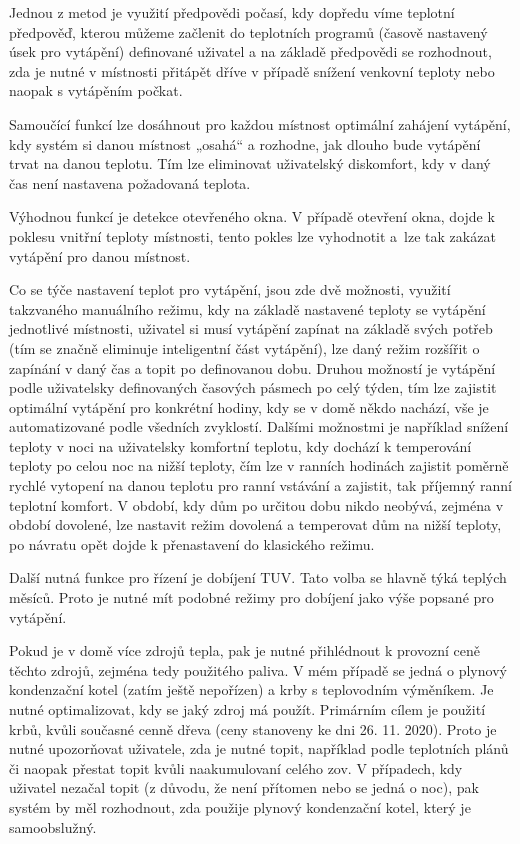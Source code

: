 Jednou z metod je využití předpovědi počasí, kdy dopředu víme teplotní předpověď, kterou můžeme začlenit do teplotních programů (časově nastavený úsek pro vytápění) definované uživatel a na základě  předpovědi se rozhodnout, zda je nutné v místnosti přitápět dříve v případě snížení venkovní teploty nebo naopak s vytápěním počkat. 

Samoučící funkcí lze dosáhnout pro každou místnost optimální zahájení vytápění, kdy systém si danou místnost „osahá“ a rozhodne, jak dlouho bude vytápění trvat na danou teplotu. Tím lze eliminovat uživatelský diskomfort, kdy v daný čas není nastavena požadovaná teplota.

Výhodnou funkcí je detekce otevřeného okna. V případě otevření okna, dojde k poklesu vnitřní teploty místnosti, tento pokles lze vyhodnotit a~lze tak zakázat vytápění pro danou místnost.

Co se týče nastavení teplot pro vytápění, jsou zde dvě možnosti, využití takzvaného manuálního režimu, kdy na základě nastavené teploty se vytápění jednotlivé místnosti, uživatel si musí vytápění zapínat na základě svých potřeb (tím se značně eliminuje inteligentní část vytápění), lze daný režim rozšířit o zapínání  v daný čas a topit po definovanou dobu. Druhou možností je vytápění podle uživatelsky definovaných časových pásmech po celý týden, tím lze zajistit optimální vytápění pro konkrétní hodiny, kdy se v domě někdo nachází, vše je automatizované podle všedních zvyklostí. Dalšími možnostmi je například snížení teploty v noci na uživatelsky komfortní teplotu, kdy dochází k temperování teploty po celou noc na nižší teploty, čím lze v ranních hodinách  zajistit poměrně rychlé vytopení na danou teplotu pro ranní vstávání a zajistit, tak příjemný ranní teplotní komfort. V období, kdy dům po určitou dobu nikdo neobývá, zejména v období dovolené, lze nastavit režim dovolená a temperovat dům na nižší teploty, po návratu opět dojde k přenastavení do klasického režimu. 

Další nutná funkce pro řízení je dobíjení TUV. Tato volba se hlavně týká teplých měsíců. Proto je nutné mít podobné režimy pro dobíjení jako výše popsané pro vytápění.

Pokud je v domě více zdrojů tepla, pak je nutné přihlédnout k provozní ceně těchto zdrojů, zejména tedy použitého paliva. V mém případě se jedná o plynový kondenzační kotel (zatím ještě nepořízen) a krby s teplovodním výměníkem. Je nutné optimalizovat, kdy se jaký zdroj má použít. Primárním cílem je použití krbů, kvůli současné cenně dřeva (ceny stanoveny ke dni 26. 11. 2020). Proto je nutné upozorňovat uživatele, zda je nutné topit, například podle teplotních plánů či naopak přestat topit kvůli naakumulovaní celého \acrshort{zov}. V případech, kdy uživatel nezačal topit (z důvodu, že není přítomen nebo se jedná o noc), pak systém by měl rozhodnout, zda použije plynový kondenzační kotel, který je samoobslužný.

